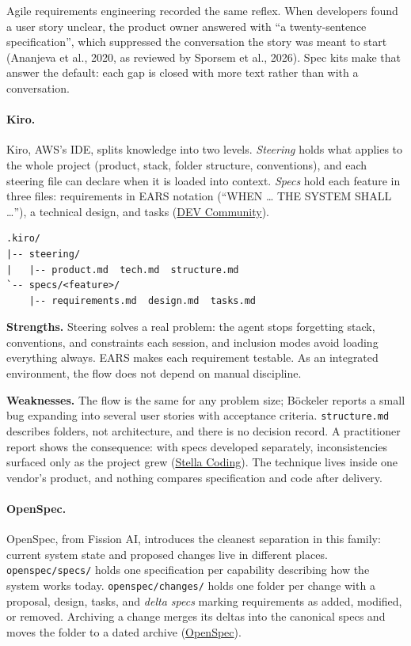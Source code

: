 \documentclass[11pt]{article}
\begin{document}
Agile requirements engineering recorded the same reflex. When developers found a user story unclear, the product owner answered with ``a twenty-sentence specification'', which suppressed the conversation the story was meant to start (Ananjeva et al., 2020, as reviewed by Sporsem et al., 2026). Spec kits make that answer the default: each gap is closed with more text rather than with a conversation.

\paragraph{Kiro.} Kiro, AWS's IDE, splits knowledge into two levels. \emph{Steering} holds what applies to the whole project (product, stack, folder structure, conventions), and each steering file can declare when it is loaded into context. \emph{Specs} hold each feature in three files: requirements in EARS notation (``WHEN \ldots{} THE SYSTEM SHALL \ldots{}''), a technical design, and tasks (\href{https://dev.to/joseph_arriola/abriste-kiro-y-ahora-que-463f}{DEV Community}).

\begin{verbatim}
.kiro/
|-- steering/
|   |-- product.md  tech.md  structure.md
`-- specs/<feature>/
    |-- requirements.md  design.md  tasks.md
\end{verbatim}

\textbf{Strengths.} Steering solves a real problem: the agent stops forgetting stack, conventions, and constraints each session, and inclusion modes avoid loading everything always. EARS makes each requirement testable. As an integrated environment, the flow does not depend on manual discipline.

\textbf{Weaknesses.} The flow is the same for any problem size; B\"ockeler reports a small bug expanding into several user stories with acceptance criteria. \texttt{structure.md} describes folders, not architecture, and there is no decision record. A practitioner report shows the consequence: with specs developed separately, inconsistencies surfaced only as the project grew (\href{https://stellacoding.substack.com/p/aws-kiro-build-fillup-using-specification-driven-development}{Stella Coding}). The technique lives inside one vendor's product, and nothing compares specification and code after delivery.

\paragraph{OpenSpec.} OpenSpec, from Fission AI, introduces the cleanest separation in this family: current system state and proposed changes live in different places. \texttt{openspec/specs/} holds one specification per capability describing how the system works today. \texttt{openspec/changes/} holds one folder per change with a proposal, design, tasks, and \emph{delta specs} marking requirements as added, modified, or removed. Archiving a change merges its deltas into the canonical specs and moves the folder to a dated archive (\href{https://openspec.dev/docs/getting-started}{OpenSpec}).
\end{document}
